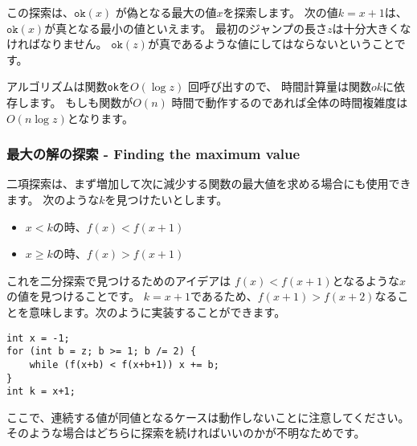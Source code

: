 この探索は、$\texttt{ok}(x)$ が偽となる最大の値$x$を探索します。
次の値$k=x+1$は、$\texttt{ok}(x)$が真となる最小の値といえます。
最初のジャンプの長さ$z$は十分大きくなければなりません。
$\texttt{ok}(z)$が真であるような値にしてはならないということです。

アルゴリズムは関数\texttt{ok}を$O(\log z)$ 回呼び出すので、
時間計算量は関数$ok$に依存します。
もしも関数が$ O(n)$ 時間で動作するのであれば全体の時間複雑度は$O(n \log z)$となります。

\subsubsection{最大の解の探索 - Finding the maximum value}
二項探索は、まず増加して次に減少する関数の最大値を求める場合にも使用できます。
次のような$k$を見つけたいとします。

\begin{itemize}
\item
$x<k$の時、$f(x)<f(x+1)$
\item
$x \ge k$の時、$f(x)>f(x+1)$
\end{itemize}

これを二分探索で見つけるためのアイデアは $f(x)<f(x+1)$となるような$x$の値を見つけることです。
$k=x+1$であるため、$f(x+1)>f(x+2)$なることを意味します。次のように実装することができます。
\begin{lstlisting}
int x = -1;
for (int b = z; b >= 1; b /= 2) {
    while (f(x+b) < f(x+b+1)) x += b;
}
int k = x+1;
\end{lstlisting}

ここで、連続する値が同値となるケースは動作しないことに注意してください。
そのような場合はどちらに探索を続ければいいのかが不明なためです。